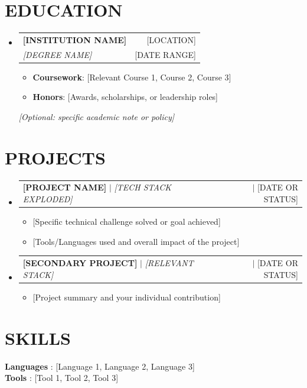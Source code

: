 \documentclass[letterpaper,11pt]{article}
\makeatletter
\newcommand{\entry}[1]{
  \item\small{
    {#1 \vspace{-1pt}}
  }
}
\newcommand{\sectionHeader}[4]{
  \vspace{-1pt}\item
    \begin{tabular*}{\textwidth}[t]{l@{\extracolsep{\fill}}r}
      \textbf{#1} & {\color{dark-grey}\small #2}\vspace{1pt}\\
      \textit{#3} & {\color{dark-grey} \small #4}\\
    \end{tabular*}\vspace{-4pt}
}
\newcommand{\projectHeader}[2]{
    \item
    \begin{tabular*}{\textwidth}{l@{\extracolsep{\fill}}r}
      #1 & {\color{dark-grey}\small #2} \\
    \end{tabular*}\vspace{-4pt}
}
\newcommand{\field}[2]{\textbf{#1} {: #2}\vspace{2pt} \\}
\newcommand{\sectionNote}[1]{{\color{dark-grey}\small\textit{#1}}}
\newcommand{\sectionListStart}{\begin{itemize}[leftmargin=0in, label={}]}
\newcommand{\sectionListEnd}{\end{itemize}}
\newcommand{\itemListStart}{\begin{itemize}}
\newcommand{\itemListEnd}{\end{itemize}\vspace{0pt}}
\makeatother
\begin{document}
\section{EDUCATION}
\sectionListStart
\sectionHeader
{[INSTITUTION NAME]}{[LOCATION]}
{[DEGREE NAME]}{[DATE RANGE]}
\itemListStart
\entry{\textbf{Coursework}: [Relevant Course 1, Course 2, Course 3]}
\entry{\textbf{Honors}: [Awards, scholarships, or leadership roles]}
\itemListEnd
\sectionNote{[Optional: specific academic note or policy]}
\sectionListEnd



\section{PROJECTS}
\sectionListStart
\projectHeader
{\textbf{[PROJECT NAME]} $|$ \textit{[TECH STACK EXPLODED]}}{\href{[LINK]}{\faGithub} $|$ [DATE OR STATUS]}
\itemListStart
\entry{[Specific technical challenge solved or goal achieved]}
\entry{[Tools/Languages used and overall impact of the project]}
\itemListEnd

\projectHeader
{\textbf{[SECONDARY PROJECT]} $|$ \textit{[RELEVANT STACK]}}{\href{[LINK]}{\faGithub} $|$ [DATE OR STATUS]}
\itemListStart
\entry{[Project summary and your individual contribution]}
\itemListEnd
\sectionListEnd




\section{SKILLS}
\begin{itemize}[leftmargin=0in, label={}]
  \small{\item{
        \field{Languages}{[Language 1, Language 2, Language 3]}
        \field{Tools}{[Tool 1, Tool 2, Tool 3]}
        }}
\end{itemize}


\end{document}
